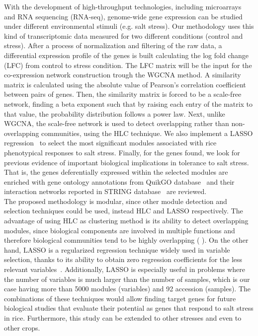 \documentclass[journal, onecolumn]{IEEEtran}
\begin{document}
With the development of high-throughput technologies, including microarrays and RNA sequencing (RNA-seq), genome-wide gene expression can be studied under different environmental stimuli (e.g. salt stress). Our methodology uses this kind of transcriptomic data measured for two different conditions (control and stress). After a process of normalization and filtering of the raw data, a differential expression profile of the genes is built calculating the log fold change (LFC) from control to stress condition. The LFC matrix will be the input for the co-expression network construction trough the WGCNA method. A similarity matrix is calculated using the absolute value of Pearson's correlation coefficient between pairs of genes. Then, the similarity matrix is forced to be a scale-free network, finding a beta exponent such that by raising each entry of the matrix to that value, the probability distribution follows a power law. Next, unlike WGCNA, the scale-free network is used to detect overlapping rather than non-overlapping communities, using the HLC technique. We also implement a LASSO regression~\cite{tibshirani1996regression} to select the most significant modules associated with rice phenotypical responses to salt stress. Finally, for the genes found, we look for previous evidence of important biological implications in tolerance to salt stress. That is, the genes deferentially expressed within the selected modules are enriched with gene ontology annotations from QuikGO database~\cite{binns2009quickgo} and their interaction networks reported in STRING database~\cite{szklarczyk2016string} are reviewed.\\

The proposed methodology is modular, since other module detection and selection techniques could be used, instead HLC and LASSO respectively. The advantage of using HLC as clustering method is its ability to detect overlapping modules, since biological components are involved in multiple functions and therefore biological communities tend to be highly overlapping ( ). On the other hand, LASSO is a regularized regression technique widely used in variable selection, thanks to its ability to obtain zero regression coefficients for the less relevant variables~\cite{desboulets2018review}. Additionally, LASSO is especially useful in problems where the number of variables is much larger than the number of samples, which is our case having more than 5000 modules (variables) and 92 accession (samples). The combinations of these techniques would allow finding target genes for future biological studies that evaluate their potential as genes that respond to salt stress in rice. Furthermore, this study can be extended to other stresses and even to other crops.\\
\end{document}
